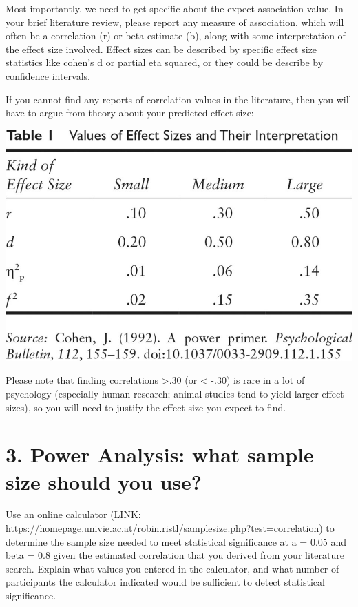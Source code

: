 \documentclass[
]{book}
\begin{document}
Most importantly, we need to get specific about the expect association value. In your brief literature review, please report any measure of association, which will often be a correlation (r) or beta estimate (b), along with some interpretation of the effect size involved. Effect sizes can be described by specific effect size statistics like cohen's d or partial eta squared, or they could be describe by confidence intervals.

If you cannot find any reports of correlation values in the literature, then you will have to argue from theory about your predicted effect size:

\includegraphics{Figs/effect_size.jpg}

Please note that finding correlations \textgreater.30 (or \textless{} -.30) is rare in a lot of psychology (especially human research; animal studies tend to yield larger effect sizes), so you will need to justify the effect size you expect to find.

\section*{3. Power Analysis: what sample size should you use?}\label{power-analysis-what-sample-size-should-you-use}

Use an online calculator (LINK: \url{https://homepage.univie.ac.at/robin.ristl/samplesize.php?test=correlation}) to determine the sample size needed to meet statistical significance at a = 0.05 and beta = 0.8 given the estimated correlation that you derived from your literature search. Explain what values you entered in the calculator, and what number of participants the calculator indicated would be sufficient to detect statistical significance.
\end{document}
